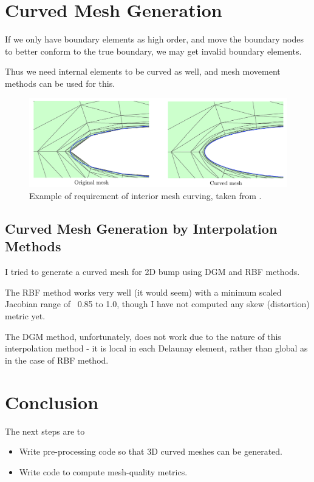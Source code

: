 \documentclass{article}
\begin{document}
\section{Curved Mesh Generation}

 
If we only have boundary elements as high order, and move the boundary nodes to better conform to the true boundary, we may get invalid boundary elements.

Thus we need internal elements to be curved as well, and mesh movement methods can be used for this.

\begin{figure}
\includegraphics[scale=0.25]{curved-mesh-example}
\caption{Example of requirement of interior mesh curving, taken from \cite{perssonelast}.}
\end{figure}
 

\subsection{Curved Mesh Generation by Interpolation Methods}
I tried to generate a curved mesh for 2D bump using DGM and RBF methods.

The RBF method works very well (it would seem) with a minimum scaled Jacobian range of ~0.85 to 1.0, though I have not computed any skew (distortion) metric yet.

The DGM method, unfortunately, does not work due to the nature of this interpolation method - it is local in each Delaunay element, rather than global as in the case of RBF method.
 

\section{Conclusion}
 
The next steps are to
\begin{itemize}
\item Write pre-processing code so that 3D curved meshes can be generated.
\item Write code to compute mesh-quality metrics.
\end{itemize}


 
\end{document}
